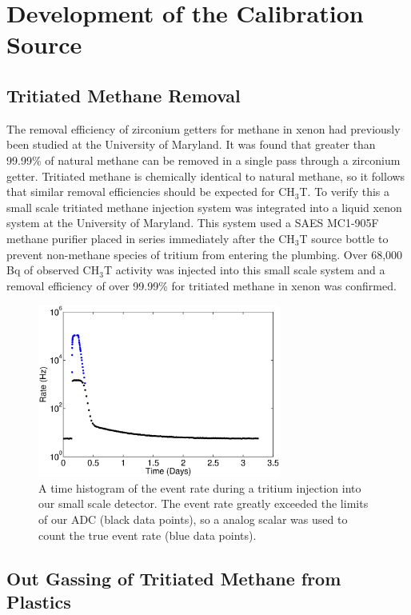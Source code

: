 \section{Development of the Calibration Source}

\subsection{Tritiated Methane Removal}
\label{sec:RD}

The removal efficiency of zirconium getters for methane in xenon had previously been studied at the University of Maryland.  It was found that greater than 99.99\% of natural methane can be removed in a single pass through a zirconium getter. \cite{Dobi_CH4} Tritiated methane is chemically identical to natural methane, so it follows that similar removal efficiencies should be expected for CH$_3$T.  To verify this a small scale tritiated methane injection system was integrated into a liquid xenon system at the University of Maryland.  This system used a SAES MC1-905F methane purifier placed in series immediately after the CH$_3$T source bottle to prevent non-methane species of tritium from entering the plumbing. Over 68,000 Bq of observed CH$_3$T activity was injected into this small scale system and a removal efficiency of over 99.99\% for tritiated methane in xenon was confirmed.

\begin{figure}[h!]\centering
\includegraphics[width=80mm]{TimeHisto_Analog2.eps}
\caption{A time histogram of the event rate during a tritium injection into our small scale detector. The event rate greatly exceeded the limits of our ADC (black data points), so a analog scalar was used to count the true event rate (blue data points). }
\label{fig:Density}
\end{figure}


\subsection{Out Gassing of Tritiated Methane from Plastics}

